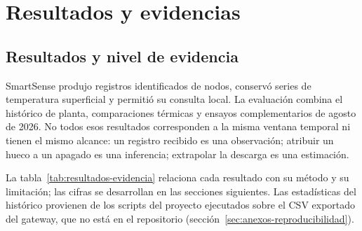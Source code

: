 \chapter{Resultados y evidencias}
\label{cap:resultados}

\section{Resultados y nivel de evidencia}
SmartSense produjo registros identificados de \NumeroNodos{} nodos, conservó series de temperatura superficial y permitió su consulta local. La evaluación combina el histórico de planta, comparaciones térmicas y ensayos complementarios de agosto de 2026. No todos esos resultados corresponden a la misma ventana temporal ni tienen el mismo alcance: un registro recibido es una observación; atribuir un hueco a un apagado es una inferencia; extrapolar la descarga es una estimación.

La tabla~\ref{tab:resultados-evidencia} relaciona cada resultado con su método y su limitación; las cifras se desarrollan en las secciones siguientes. Las estadísticas del histórico provienen de los scripts del proyecto ejecutados sobre el CSV exportado del gateway, que no está en el repositorio (sección~\ref{sec:anexos-reproducibilidad}).

